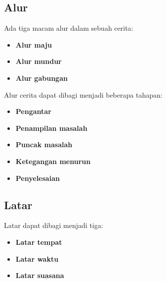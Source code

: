\documentclass[12pt,a4paper]{article}
\begin{document}
\subsection{Alur}
Ada tiga macam alur dalam sebuah cerita:
\begin{itemize}
    \item \textbf{Alur maju}
    \item \textbf{Alur mundur}
    \item \textbf{Alur gabungan}
\end{itemize}
Alur cerita dapat dibagi menjadi beberapa tahapan:
\begin{itemize}
    \item \textbf{Pengantar}
    \item \textbf{Penampilan masalah}
    \item \textbf{Puncak masalah}
    \item \textbf{Ketegangan menurun}
    \item \textbf{Penyelesaian}
\end{itemize}

\subsection{Latar}
Latar dapat dibagi menjadi tiga:
\begin{itemize}
    \item \textbf {Latar tempat}
    \item \textbf {Latar waktu}
    \item \textbf {Latar suasana}
\end{itemize}
\end{document}
